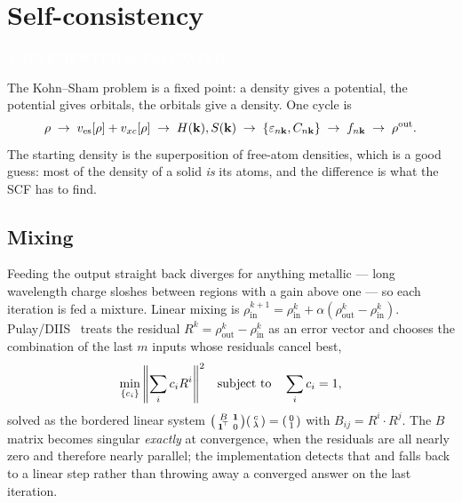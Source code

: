 \documentclass[11pt,a4paper]{article}
\newcommand{\badge}[2]{%
  \par\vspace{2pt}\noindent
  \colorbox{#1}{\textcolor{white}{\small\bfseries\,#2\,}}\par\vspace{4pt}}
\newcommand{\implemented}{\badge{okgreen}{IMPLEMENTED \& VALIDATED}}
\begin{document}
\section{Self-consistency}
\label{sec:scf}
\implemented

The Kohn--Sham problem is a fixed point: a density gives a potential, the
potential gives orbitals, the orbitals give a density. One cycle is
\begin{equation}
  \rho \;\to\; v_{\text{es}}[\rho] + v_{xc}[\rho]
     \;\to\; H(\vb{k}), S(\vb{k})
     \;\to\; \{\varepsilon_{n\vb{k}}, C_{n\vb{k}}\}
     \;\to\; f_{n\vb{k}}
     \;\to\; \rho^{\text{out}} .
\end{equation}
The starting density is the superposition of free-atom densities, which is a
good guess: most of the density of a solid \emph{is} its atoms, and the
difference is what the SCF has to find.

\subsection{Mixing}

Feeding the output straight back diverges for anything metallic --- long
wavelength charge sloshes between regions with a gain above one --- so each
iteration is fed a mixture. Linear mixing is
$\rho^{k+1}_{\text{in}} = \rho^k_{\text{in}}
 + \alpha(\rho^k_{\text{out}} - \rho^k_{\text{in}})$.
Pulay/DIIS~\cite{pulay} treats the residual
$R^k = \rho^k_{\text{out}} - \rho^k_{\text{in}}$ as an error vector and
chooses the combination of the last $m$ inputs whose residuals cancel best,
\begin{equation}
  \min_{\{c_i\}} \norm{\sum_i c_i R^i}^2
  \quad\text{subject to}\quad \sum_i c_i = 1,
\end{equation}
solved as the bordered linear system
$\begin{psmallmatrix} B & \mathbf{1} \\ \mathbf{1}^{\!\top} & 0
\end{psmallmatrix}
\begin{psmallmatrix} c \\ \lambda \end{psmallmatrix} =
\begin{psmallmatrix} 0 \\ 1 \end{psmallmatrix}$
with $B_{ij} = R^i\cdot R^j$. The $B$ matrix becomes singular \emph{exactly}
at convergence, when the residuals are all nearly zero and therefore nearly
parallel; the implementation detects that and falls back to a linear step
rather than throwing away a converged answer on the last iteration.
\end{document}
